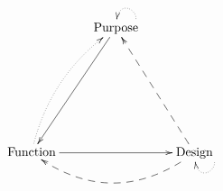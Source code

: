 \documentclass[12pt,leqno]{report}  %
\begin{document}
\[\xymatrix{ & \text{Purpose}\ar@(r,u)@{.>}[]_{}\ar[dddl]^{}\\ \\ \\
\text{Function}\ar[rr]^{}\ar@/^1pc/@{.>}[uuur]^{} & & \text{Design} \ar@(r,d)@{.>}[]^{}\ar@{-->}[uuul]^{}\ar@{-->}@/^2pc/[ll]^{}
}\]
\end{document}
